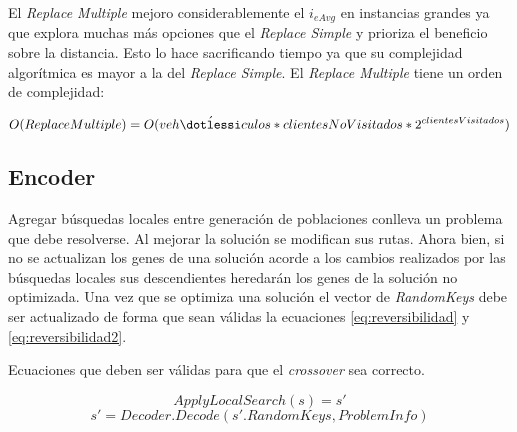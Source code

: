 \bigskip

El \textit{Replace Multiple} mejoro considerablemente el $i_{eAvg}$ en instancias grandes ya que explora muchas más opciones que el \textit{Replace Simple} y prioriza el beneficio sobre la distancia. Esto lo hace sacrificando tiempo ya que su complejidad algorítmica es mayor a la del \textit{Replace Simple}. El \textit{Replace Multiple} tiene un orden de complejidad:

\begin{equation*}
O(Replace Multiple) = O(veh\acute{\dotlessi}culos * clientesNoVisitados * 2^{clientesVisitados})
\end{equation*}


\subsection{Encoder}

Agregar búsquedas locales entre generación de poblaciones conlleva un problema que debe resolverse. Al mejorar la solución se modifican sus rutas. Ahora bien, si no se actualizan los genes de una solución acorde a los cambios realizados por las búsquedas locales sus descendientes heredarán los genes de la solución no optimizada. Una vez que se optimiza una solución el vector de \textit{RandomKeys} debe ser actualizado de forma que sean válidas la ecuaciones \ref{eq:reversibilidad} y \ref{eq:reversibilidad2}.

\bigskip

\begin{mycapequ}[!ht]
	\caption{Ecuaciones que deben ser válidas para que el \textit{crossover} sea correcto.}
	\begin{equation} \label{eq:reversibilidad}
	ApplyLocalSearch(s) = s'
	\end{equation}
	\begin{equation} \label{eq:reversibilidad2}
	s' = Decoder.Decode(s'.RandomKeys, ProblemInfo)
	\end{equation}
\end{mycapequ}

\bigskip

